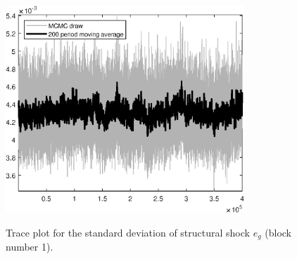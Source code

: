 \begin{figure}[H]
\centering
  \includegraphics[width=0.8\textwidth]{BRS_growth/graphs/TracePlot_SE_e_g_blck_1}\\
    \caption{Trace plot for the standard deviation of structural shock ${e_g}$ (block number 1).}
\end{figure}
